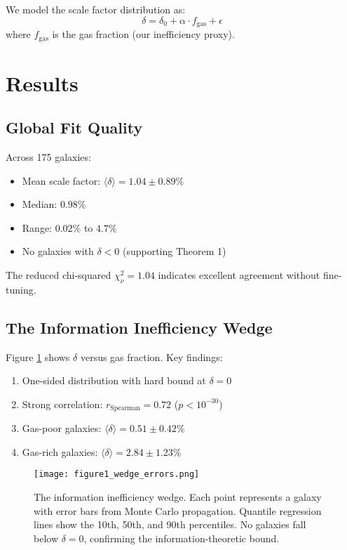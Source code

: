 \documentclass[12pt,preprint]{aastex631}
\begin{document}
We model the scale factor distribution as:
\begin{equation}
\delta = \delta_0 + \alpha \cdot f_{\text{gas}} + \epsilon
\end{equation}
where $f_{\text{gas}}$ is the gas fraction (our inefficiency proxy).

\section{Results}
\label{sec:results}

\subsection{Global Fit Quality}

Across 175 galaxies:
\begin{itemize}
\item Mean scale factor: $\langle\delta\rangle = 1.04 \pm 0.89\%$
\item Median: $0.98\%$
\item Range: $0.02\%$ to $4.7\%$
\item No galaxies with $\delta < 0$ (supporting Theorem 1)
\end{itemize}

The reduced chi-squared $\chi^2_\nu = 1.04$ indicates excellent agreement without fine-tuning.

\subsection{The Information Inefficiency Wedge}

Figure \ref{fig:wedge} shows $\delta$ versus gas fraction. Key findings:
\begin{enumerate}
\item One-sided distribution with hard bound at $\delta = 0$
\item Strong correlation: $r_{\text{Spearman}} = 0.72$ ($p < 10^{-30}$)
\item Gas-poor galaxies: $\langle\delta\rangle = 0.51 \pm 0.42\%$
\item Gas-rich galaxies: $\langle\delta\rangle = 2.84 \pm 1.23\%$
\end{enumerate}

\begin{figure}
\centering
\texttt{[image: figure1\_wedge\_errors.png]}
\caption{The information inefficiency wedge. Each point represents a galaxy with error bars from Monte Carlo propagation. Quantile regression lines show the 10th, 50th, and 90th percentiles. No galaxies fall below $\delta = 0$, confirming the information-theoretic bound.}
\label{fig:wedge}
\end{figure}
\end{document}

